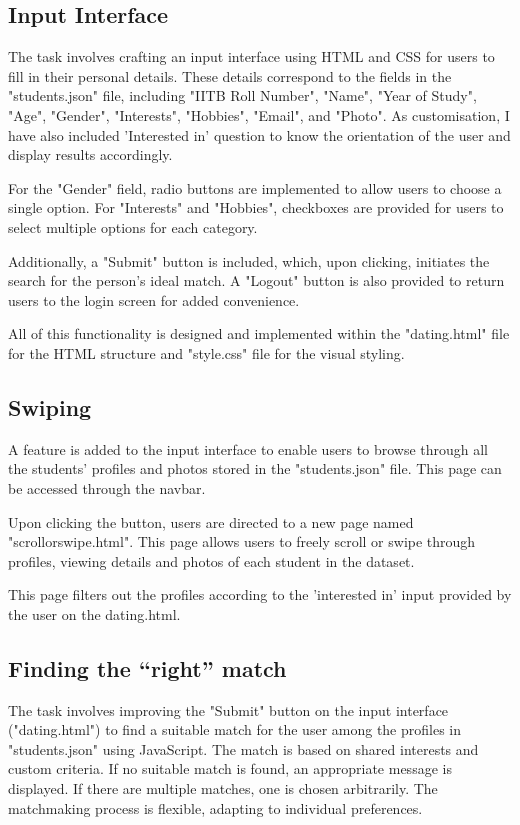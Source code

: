 \documentclass[12pt,a4paper]{article}
\begin{document}
\subsection{Input Interface}

The task involves crafting an input interface using HTML and CSS for users to fill in their personal details. These details correspond to the fields in the "students.json" file, including "IITB Roll Number", "Name", "Year of Study", "Age", "Gender", "Interests", "Hobbies", "Email", and "Photo".
As customisation, I have also included 'Interested in' question to know the orientation of the user and display results accordingly.

For the "Gender" field, radio buttons are implemented to allow users to choose a single option. For "Interests" and "Hobbies", checkboxes are provided for users to select multiple options for each category.

Additionally, a "Submit" button is included, which, upon clicking, initiates the search for the person's ideal match. A "Logout" button is also provided to return users to the login screen for added convenience.

All of this functionality is designed and implemented within the "dating.html" file for the HTML structure and "style.css" file for the visual styling.
\subsection{Swiping}
A feature is added to the input interface to enable users to browse through all the students' profiles and photos stored in the "students.json" file. This page can be accessed through the navbar.

Upon clicking the button, users are directed to a new page named \\"scroll\textunderscore or\textunderscore swipe.html". This page allows users to freely scroll or swipe through profiles, viewing details and photos of each student in the dataset.

This page filters out the profiles according to the 'interested in' input provided by the user on the dating.html. 

\subsection{Finding the “right'' match}

The task involves improving the "Submit" button on the input interface ("dating.html") to find a suitable match for the user among the profiles in "students.json" using JavaScript. The match is based on shared interests and custom criteria. If no suitable match is found, an appropriate message is displayed. If there are multiple matches, one is chosen arbitrarily. The matchmaking process is flexible, adapting to individual preferences.
\end{document}
